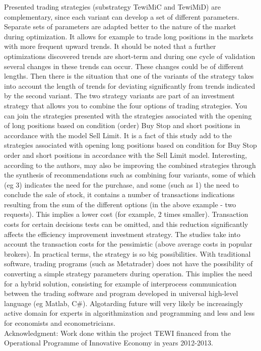 \documentclass{tewiart}
\begin{document}
Presented trading strategies (substrategy TewiMiC and TewiMiD) are complementary, since each variant can develop a set of different parameters. Separate sets of parameters are adapted better to the nature of the market during optimization. It allows for example to trade long positions in the markets with more frequent upward trends. It should be noted that a further optimizations discovered trends are short-term and during one cycle of validation several changes in these trends can occur. These changes could be of different lengths. Then there is the situation that one of the variants of the strategy takes into account the length of trends for deviating significantly from trends indicated by the second variant. The two strategy variants are part of an investment strategy that allows you to combine the four options of trading strategies. You can join the strategies presented with the strategies associated with the opening of long positions based on condition (order) Buy Stop and short positions in accordance with the model Sell Limit. It is a fact of this study add to the strategies associated with opening long positions based on condition for Buy Stop order and short positions in accordance with the Sell Limit model. Interesting, according to the authors, may also be improving the combined strategies through the synthesis of recommendations such as combining four variants, some of which (eg 3) indicates the need for the purchase, and some (such as 1) the need to conclude the sale of stock, it contains a number of transactions indications resulting from the sum of the different options (in the above example - two requests). This implies a lower cost (for example, 2 times smaller). Transaction costs for certain decisions tests can be omitted, and this reduction significantly affects the efficiency improvement investment strategy. The studies take into account the transaction costs for the pessimistic (above average costs in popular brokers). In practical terms, the strategy is so big possibilities. With traditional software, trading programs (such as Metatrader) does not have the possibility of converting a simple strategy parameters during operation. This implies the need for a hybrid solution, consisting for example of interprocess communication between the trading software and program developed in universal high-level language (eg Matlab, C\#). Algotarding future will very likely be increasingly active domain for experts in algorithmization and programming and less and less for economists and econometricians.\\

\noindent Acknowledgment: Work done within the project TEWI financed from the Operational Programme of Innovative Economy in years 2012-2013.
 


\end{document}
